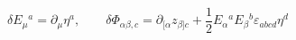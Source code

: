 \begin{equation}
\delta E_\mu{}^a = \partial_\mu \eta^a, \qquad \delta
\Phi_{\alpha\beta,c} = \partial_{[\alpha} z_{\beta]c} + \frac{1}{2}
E_\alpha{}^a E_\beta{}^b \varepsilon_{abcd} \eta^d
\end{equation}


